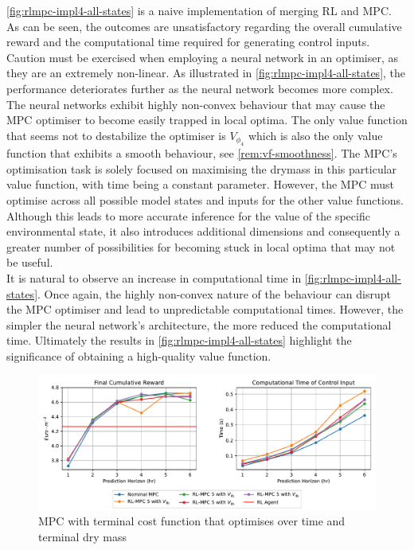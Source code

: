 \autoref{fig:rlmpc-impl4-all-states} is a naive implementation of merging RL and MPC. As can be seen, the outcomes are unsatisfactory regarding the overall cumulative reward and the computational time required for generating control inputs. Caution must be exercised when employing a neural network in an optimiser, as they are an extremely non-linear. As illustrated in \autoref{fig:rlmpc-impl4-all-states}, the performance deteriorates further as the neural network becomes more complex. The neural networks exhibit highly non-convex behaviour that may cause the MPC optimiser to become easily trapped in local optima. The only value function that seems not to destabilize the optimiser is ${V}_{\phi_4}$ which is also the only value function that exhibits a smooth behaviour, see \cref{rem:vf-smoothness}. The MPC's optimisation task is solely focused on maximising the drymass in this particular value function, with time being a constant parameter. However, the MPC must optimise across all possible model states and inputs for the other value functions. Although this leads to more accurate inference for the value of the specific environmental state, it also introduces additional dimensions and consequently a greater number of possibilities for becoming stuck in local optima that may not be useful.\\
It is natural to observe an increase in computational time in \autoref{fig:rlmpc-impl4-all-states}. Once again, the highly non-convex nature of the behaviour can disrupt the MPC optimiser and lead to unpredictable computational times. However, the simpler the neural network's architecture, the more reduced the computational time. Ultimately the results in \autoref{fig:rlmpc-impl4-all-states} highlight the significance of obtaining a high-quality value function.

\begin{figure}[H]
	\centering
	\includegraphics[width=\textwidth]{figures/rl_mpc_impl_4_1.pdf}
	\caption{MPC with terminal cost function that optimises over time and terminal dry mass}
	\label{fig:rlmpc-impl4-only-drymass}
\end{figure}

